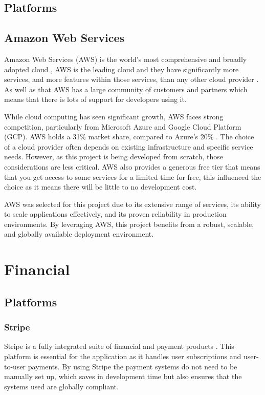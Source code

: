 \documentclass[]{project_report}
\begin{document}
\subsection{Platforms}

\subsection{Amazon Web Services}

Amazon Web Services (AWS) is the world’s most comprehensive and broadly adopted cloud \cite{what_is_aws}, AWS is the leading cloud and they have significantly more services, and more features within those services, than any other cloud provider \cite{what_is_aws}. As well as that AWS has a large community of customers and partners which means that there is lots of support for developers using it.  

While cloud computing has seen significant growth, AWS faces strong competition, particularly from Microsoft Azure and Google Cloud Platform (GCP). AWS holds a 31\% market share, compared to Azure's 20\% \cite{amazon_statistics}. The choice of a cloud provider often depends on existing infrastructure and specific service needs. However, as this project is being developed from scratch, those considerations are less critical. AWS also provides a generous free tier that means that you get access to some services for a limited time for free, this influenced the choice as it means there will be little to no development cost.

AWS was selected for this project due to its extensive range of services, its ability to scale applications effectively, and its proven reliability in production environments. By leveraging AWS, this project benefits from a robust, scalable, and globally available deployment environment.

\section{Financial}
\subsection{Platforms}
\subsubsection{Stripe}

Stripe is a fully integrated suite of financial and payment products \cite{stripe}. This platform is essential for the application as it handles user subscriptions and user-to-user payments. By using Stripe the payment systems do not need to be manually set up, which saves in development time but also ensures that the systems used are globally compliant.
\end{document}
